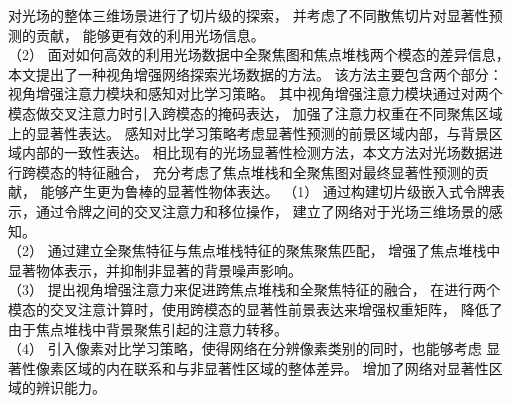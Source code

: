 对光场的整体三维场景进行了切片级的探索，
并考虑了不同散焦切片对显著性预测的贡献，
能够更有效的利用光场信息。
\\
%
%
%
%
\indent
%
%
（2）
%
%
面对如何高效的利用光场数据中全聚焦图和焦点堆栈两个模态的差异信息，
本文提出了一种视角增强网络探索光场数据的方法。
该方法主要包含两个部分：视角增强注意力模块和感知对比学习策略。
其中视角增强注意力模块通过对两个模态做交叉注意力时引入跨模态的掩码表达，
加强了注意力权重在不同聚焦区域上的显著性表达。
感知对比学习策略考虑显著性预测的前景区域内部，与背景区域内部的一致性表达。
相比现有的光场显著性检测方法，本文方法对光场数据进行跨模态的特征融合，
充分考虑了焦点堆栈和全聚焦图对最终显著性预测的贡献，
能够产生更为鲁棒的显著性物体表达。
%
%
%
%
（1）
通过构建切片级嵌入式令牌表示，通过令牌之间的交叉注意力和移位操作，
建立了网络对于光场三维场景的感知。
\\
%
%
%
%
\indent
（2）
通过建立全聚焦特征与焦点堆栈特征的聚焦聚焦匹配，
增强了焦点堆栈中显著物体表示，并抑制非显著的背景噪声影响。
\\
%
%
%
%
\indent
（3）
提出视角增强注意力来促进跨焦点堆栈和全聚焦特征的融合，
在进行两个模态的交叉注意计算时，使用跨模态的显著性前景表达来增强权重矩阵，
降低了由于焦点堆栈中背景聚焦引起的注意力转移。
\\
%
%
%
%
\indent
（4）
引入像素对比学习策略，使得网络在分辨像素类别的同时，也能够考虑
显著性像素区域的内在联系和与非显著性区域的整体差异。
增加了网络对显著性区域的辨识能力。
%
%
%

